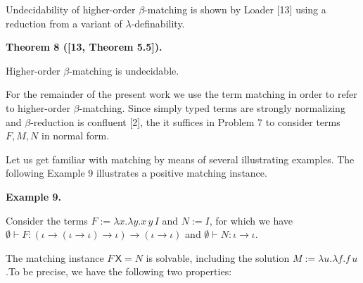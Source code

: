 Undecidability of higher-order $\beta$-matching is shown by Loader [13] using a reduction from a variant of $\lambda$-definability.\par
 
 
 
\par\medskip\noindent\textbf{Theorem 8 ([13, Theorem 5.5]).}\par
 
 
Higher-order $\beta$-matching is undecidable.\par
 
 
 
 
For the remainder of the present work we use the term matching in order to refer to higher-order $\beta$-matching. Since simply typed terms are strongly normalizing and $\beta$-reduction is confluent [2], the it suffices in Problem 7 to consider terms $F,M,N$ in normal form.\par
 
 
 
Let us get familiar with matching by means of several illustrating examples. The following Example 9 illustrates a positive matching instance.\par
 
 
 
\par\medskip\noindent\textbf{Example 9.}\par
 
 
Consider the terms $F:=\lambda x.\lambda y.x\,y\,I$ and $N:=I$, for which we have $\emptyset\vdash F:(\iota\to(\iota\to\iota)\to\iota)\to(\iota\to\iota)$ and $\emptyset\vdash N:\iota\to\iota$.\par
 
 
 
The matching instance ${F}\,\mathsf{X}=N$ is solvable, including the solution $M:=\lambda u.\lambda f.f\,u$.To be precise, we have the following two properties:\par
  
